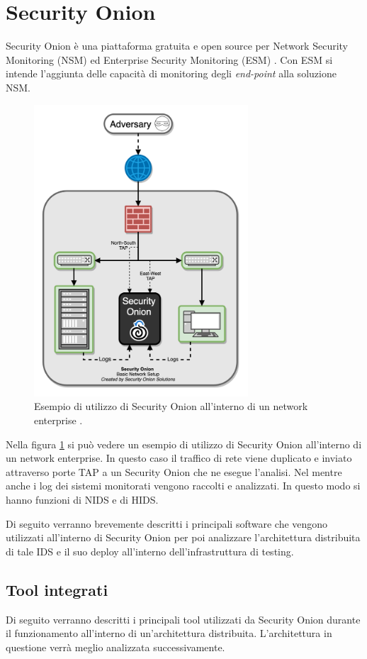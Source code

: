 \section{Security Onion}
Security Onion \cite{secOnion} è   una  piattaforma gratuita e open source per Network Security Monitoring (NSM) ed Enterprise Security Monitoring (ESM) \cite{secOnionDoc}.
Con  ESM si intende l'aggiunta delle capacità di  monitoring degli \textit{end-point} alla soluzione NSM.
\begin{figure}[hbtp]
    \centering
    \includegraphics[width=8cm]{res/fig/SecOnionExample1.png}
    \caption{Esempio di utilizzo di Security Onion all'interno di un network enterprise \cite{SecOnionFig1}.}
    \label{fig:seconionexample}
\end{figure}

Nella figura \ref{fig:seconionexample} si può vedere un esempio di utilizzo di Security Onion all'interno di un network enterprise.
In questo caso il traffico di rete viene duplicato e inviato attraverso porte TAP a un  Security Onion che ne esegue l'analisi. Nel mentre anche i log dei sistemi monitorati vengono raccolti e analizzati. In questo modo si hanno funzioni di NIDS e di HIDS.

Di seguito verranno brevemente descritti i principali software che vengono utilizzati all'interno di Security Onion per poi analizzare l'architettura distribuita di tale IDS e il suo deploy all'interno dell'infrastruttura di testing.

\subsection{Tool integrati}
Di seguito verranno descritti i principali tool utilizzati da Security Onion durante il funzionamento all'interno di un'architettura distribuita. L'architettura in questione verrà meglio analizzata successivamente.
